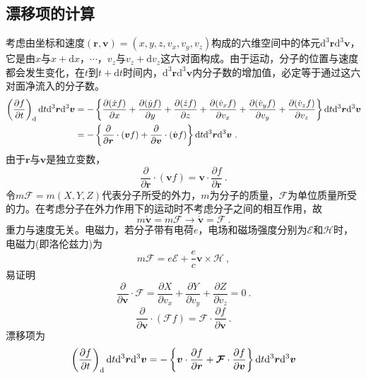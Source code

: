 \documentclass[12pt,a4paper]{article}
\renewcommand{\vec}[1]{\boldsymbol{#1}}
\newcommand{\dif}{\mathrm{d}}
\begin{document}
\subsection{漂移项的计算}
考虑由坐标和速度$(\vec{r}, \vec{v}) = (x,y,z,v_x,v_y,v_z)$构成的六维空间中的体元$\dif^3 \vec{r} \dif^3 \vec{v}$，它是由$x$与$x+\dif x$，$\cdots$，$v_z$与$v_z+\dif v_z$这六对面构成。由于运动，分子的位置与速度都会发生变化，在$t$到$t+\dif t$时间内，$\dif^3 \vec{r} \dif^3 \vec{v}$内分子数的增加值，必定等于通过这六对面净流入的分子数。
\begin{align}
\left(\dfrac{\partial f}{\partial t} \right)_{\rm d} \dif t \dif^3 \vec{r} \dif^3 \vec{v} &= - \left\{\dfrac{\partial (\dot{x} f)}{\partial x} +\dfrac{\partial (\dot{y} f)}{\partial y} +\dfrac{\partial (\dot{z} f)}{\partial z} +\dfrac{\partial (\dot{v}_x f)}{\partial v_x} +\dfrac{\partial (\dot{v}_y f)}{\partial v_y} +\dfrac{\partial (\dot{v}_z f)}{\partial v_z} \right\} \dif t \dif^3 \vec{r} \dif^3 \vec{v} \\
&=  - \left\{\dfrac{\partial}{\partial \vec{r} } \cdot (\vec{v} f) +\dfrac{\partial}{\partial \vec{v} } \cdot (\dot{\vec{v}} f)   \right\} \dif t \dif^3 \vec{r} \dif^3 \vec{v} ~.
\end{align}
由于$\vec{r}$与$\vec{v}$是独立变数，
\begin{equation}
\dfrac{\partial}{\partial \vec{r} } \cdot (\vec{v} f) = \vec{v} \cdot  \dfrac{\partial f}{\partial \vec{r} } ~.
\end{equation}
令$m \vec{\mathcal F} = m(X, Y, Z)$代表分子所受的外力，$m$为分子的质量，$\vec{\mathcal F}$为单位质量所受的力。在考虑分子在外力作用下的运动时不考虑分子之间的相互作用，故
\begin{equation}
m \dot{\vec{v}} = m \vec{\mathcal F}  \rightarrow  \dot{\vec{v}} = \vec{\mathcal F} ~.
\end{equation}
重力与速度无关。电磁力，若分子带有电荷$e$，电场和磁场强度分别为$\mathcal E$和$\mathcal H$时，电磁力(即洛伦兹力)为
\begin{equation}
m \vec{\mathcal F} = e \mathcal E + \dfrac{e}{c} \vec{v} \times \mathcal H ~,
\end{equation}
易证明
\begin{equation}
\dfrac{\partial}{\partial \vec{v} } \cdot \vec{\mathcal F} = \dfrac{\partial X }{\partial v_x } +\dfrac{\partial Y}{\partial v_y } +\dfrac{\partial Z }{\partial v_z } = 0 ~.
\end{equation}
\begin{equation}
\dfrac{\partial}{\partial \vec{v} } \cdot (\vec{\mathcal F} f) = \vec{\mathcal F} \cdot \dfrac{\partial f}{\partial \vec{v} } ~.
\end{equation}
漂移项为
\begin{equation}
\left( \dfrac{\partial f}{\partial t} \right)_{\rm d}  \dif t \dif^3 \vec{r} \dif^3 \vec{v} = -\left\{\vec{v} \cdot  \dfrac{\partial f}{\partial \vec{r} }  + \vec{\mathcal F} \cdot \dfrac{\partial f}{\partial \vec{v} }  \right\} \dif t \dif^3 \vec{r} \dif^3 \vec{v}
\end{equation}
\end{document}
